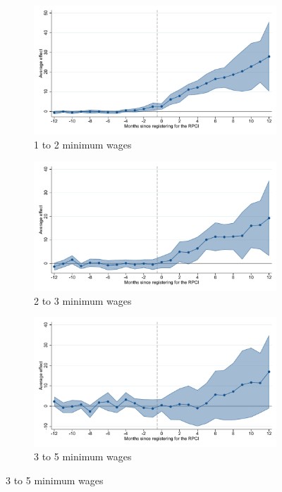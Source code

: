 \begin{figure}[H]
    \begin{subfigure}{0.32\textwidth}
    \caption{1 to 2 minimum wages}
    \includegraphics[width=\textwidth]{04_Figures/muestra_10porciento/event_study_sal_cierre_sal_min_1_2_dcdh_connected.pdf}
    \end{subfigure}
    \begin{subfigure}{0.32\textwidth}
    \caption{2 to 3 minimum wages}
    \includegraphics[width=\textwidth]{04_Figures/muestra_10porciento/event_study_sal_cierre_sal_min_2_3_dcdh_connected.pdf}
    \end{subfigure}
    \begin{subfigure}{0.32\textwidth}
    \caption{3 to 5 minimum wages}
    \includegraphics[width=\textwidth]{04_Figures/muestra_10porciento/event_study_sal_cierre_sal_min_3_5_dcdh_connected.pdf}
    \end{subfigure}


\end{figure}
